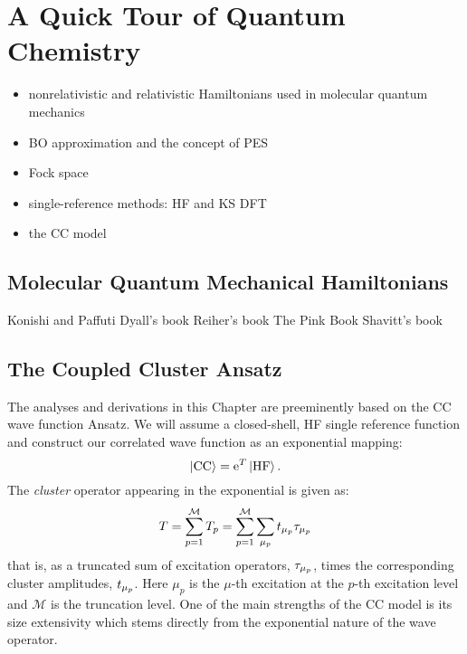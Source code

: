 
\renewcommand{\thefigure}{\arabic{chapter}.\arabic{figure}}

\chapter{A Quick Tour of Quantum Chemistry}\label{ch:QM}

\begin{itemize}
  \item nonrelativistic and relativistic Hamiltonians used in molecular
    quantum mechanics
  \item \ac{BO} approximation and the concept of \ac{PES}
  \item Fock space
  \item single-reference methods: \ac{HF} and \ac{KS} \ac{DFT}
  \item the \ac{CC}  model
\end{itemize}

\pagebreak

\section{Molecular Quantum Mechanical Hamiltonians}\label{sec:hamiltonians}

Konishi and Paffuti\autocite{Konishi2009-zb}
Dyall's book\autocite{Dyall2007-tu}
Reiher's book\autocite{Reiher2014-cp}
The Pink Book\autocite{Helgaker2000-tz}
Shavitt's book\autocite{Shavitt2009-mr}

\section{The Coupled Cluster Ansatz}\label{sec:coupled-cluster}


The analyses and derivations in this Chapter are preeminently based
on the \acl{CC} wave function Ansatz.
We will assume a closed-shell, \acs{HF} single reference function and
construct our correlated wave function as an exponential mapping:
\begin{equation}
  \ket{\mathrm{CC}} = \mathrm{e}^{T}\ket{\mathrm{HF}}.
\end{equation}
The \emph{cluster} operator appearing in the exponential is given as:
\begin{equation}
  T = \sum_{p=1}^\mathcal{M} T_p = \sum_{p=1}^\mathcal{M}\sum_{\mu_p}t_{\mu_p}\tau_{\mu_p}
\end{equation}
that is, as a truncated sum of excitation operators, $\tau_{\mu_p}$,
times the corresponding cluster amplitudes, $t_{\mu_p}$.
Here $\mu_p$ is the $\mu$-th excitation at the $p$-th excitation level and
$\mathcal{M}$ is the truncation level.
One of the main strengths of the \acs{CC} model is its size extensivity
which stems directly from the exponential nature of the wave
operator.~\autocite{Shavitt2009-mr, Helgaker2000-tz}

